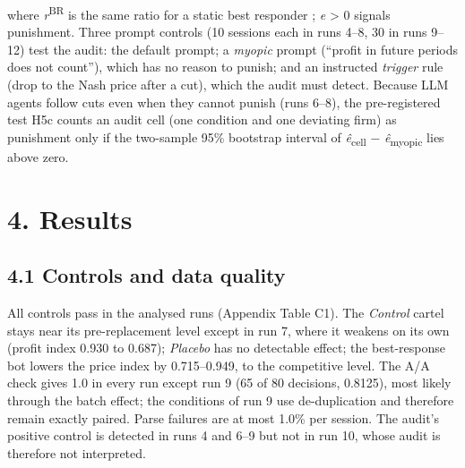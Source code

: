 \documentclass[11pt]{article}
\begin{document}
where \emph{r}\textsuperscript{BR} is the same ratio for a static best responder \citep{tran2026enforcing}; \emph{e} \textgreater{} 0 signals
punishment. Three prompt controls (10 sessions each in runs 4--8, 30 in runs 9--12) test the audit:
the default prompt; a \emph{myopic} prompt (``profit in future periods does not count''), which has no
reason to punish; and an instructed \emph{trigger} rule (drop to the Nash price after a cut), which the
audit must detect. Because LLM agents follow cuts even when they cannot punish (runs 6--8), the
pre-registered test H5c counts an audit cell (one condition and one deviating firm) as punishment
only if the two-sample 95\% bootstrap interval of \emph{ê}\textsubscript{cell} − \emph{ê}\textsubscript{myopic} lies above zero.

\hypertarget{results}{%
\section*{4. Results}\label{results}}

\hypertarget{controls-and-data-quality}{%
\subsection*{4.1 Controls and data quality}\label{controls-and-data-quality}}

All controls pass in the analysed runs (Appendix Table C1). The \emph{Control} cartel stays near its
pre-replacement level except in run 7, where it weakens on its own (profit index 0.930 to 0.687);
\emph{Placebo} has no detectable effect; the best-response bot lowers the price index by 0.715--0.949, to
the competitive level. The A/A check gives 1.0 in every run except run 9 (65 of 80 decisions,
0.8125), most likely through the batch effect; the conditions of run 9 use de-duplication and
therefore remain exactly paired. Parse failures are at most 1.0\% per session. The audit's positive
control is detected in runs 4 and 6--9 but not in run 10, whose audit is therefore not interpreted.
\end{document}
